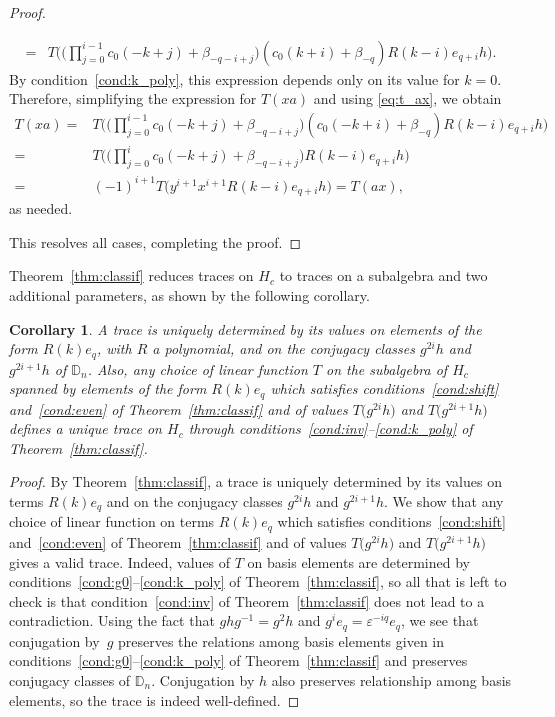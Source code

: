 \documentclass[pdftex]{sigma}
\newcommand\DD{\mathbb{D}}
\newcommand\eps{\varepsilon}
\numberwithin{equation}{section}
\newtheorem{Corollary}[Theorem]{Corollary}
\theoremstyle{definition}
\begin{document}
\begin{proof}
\begin{itemize}
\begin{align*}
 ={}& T\Bigg( \Bigg(
 \prod\limits_{j = 0}^{i - 1}
 c_0 (-k + j) + \beta_{-q - i + j}
 \Bigg)
( c_0 (k + i) + \beta_{-q})
 R(k - i) e_{q + i} h \Bigg).
 \end{align*}
 By condition~\ref{cond:k_poly},
 this expression depends only on its value
 for $k = 0$.
 Therefore, simplifying the expression for $T(xa)$
 and using \eqref{eq:t_ax}, we obtain
 \begin{align*}
 T(xa)
 ={}& T\Bigg( \Bigg(
 \prod\limits_{j = 0}^{i - 1}
 c_0 (-k + j) + \beta_{-q - i + j}
 \Bigg)
( c_0 (-k + i) + \beta_{-q})
 R(k - i) e_{q + i} h \Bigg) \\
 ={}& T\Bigg( \Bigg(
 \prod\limits_{j = 0}^i
 c_0 (-k + j) + \beta_{-q - i + j}
 \Bigg)
 R(k - i) e_{q + i} h \Bigg) \\
 ={}& (-1)^{i + 1} T\bigl( y^{i + 1} x^{i + 1}
 R(k - i) e_{q + i} h \bigr) = T(ax),
 \end{align*}
 as needed.
 \end{itemize}
 This resolves all cases, completing the proof.
\end{proof}

Theorem~\ref{thm:classif} reduces traces on $H_c$ to traces on a subalgebra
and two additional parameters, as shown by the following corollary.

\begin{Corollary}
 \label{cor:unique}
 A trace is uniquely determined by its values
 on elements of the form $R(k) e_q$, with $R$ a polynomial,
 and on the conjugacy classes $g^{2i} h$ and $g^{2i + 1} h$
 of $\DD_n$.
 Also, any choice of linear function $T$ on the subalgebra of $H_c$
 spanned by elements of the form $R(k) e_q$
 which satisfies conditions~\ref{cond:shift} and~\ref{cond:even}
 of Theorem~{\rm\ref{thm:classif}}
 and of values $T\bigl(g^{2i} h\bigr)$ and $T\bigl(g^{2i + 1} h\bigr)$
 defines a unique trace on $H_c$
 through conditions~\ref{cond:inv}--\ref{cond:k_poly}
 of Theorem~{\rm\ref{thm:classif}}.
\end{Corollary}

\begin{proof}
 By Theorem~\ref{thm:classif}, a trace is uniquely determined
 by its values on terms $R(k) e_q$
 and on the conjugacy classes $g^{2i} h$ and $g^{2i + 1} h$.
 We show that any choice of linear function on terms $R(k) e_q$
 which satisfies conditions~\ref{cond:shift} and~\ref{cond:even}
 of Theorem~\ref{thm:classif}
 and of values $T\bigl(g^{2i} h\bigr)$ and $T\bigl(g^{2i + 1} h\bigr)$
 gives a valid trace.
 Indeed, values of $T$ on basis elements
 are determined by conditions~\ref{cond:g0}--\ref{cond:k_poly}
 of Theorem~\ref{thm:classif},
 so all that is left to check
 is that condition~\ref{cond:inv} of Theorem~\ref{thm:classif}
 does not lead to a contradiction.
 Using the fact that $ghg^{-1} = g^2 h$
 and $g^i e_q = \eps^{-iq} e_q$,
 we see that conjugation by~$g$ preserves
 the relations among basis elements
 given in conditions~\ref{cond:g0}--\ref{cond:k_poly}
 of Theorem~\ref{thm:classif}
 and preserves conjugacy classes of $\DD_n$.
 Conjugation by $h$ also preserves
 relationship among basis elements,
 so the trace is indeed well-defined.
\end{proof}
\end{document}
